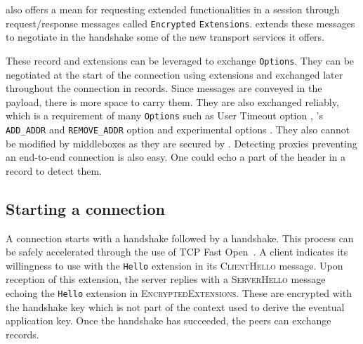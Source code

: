 
\tls also offers a mean for requesting extended functionalities in a \tls session through
request/response messages called \tls \texttt{Encrypted} \texttt{Extensions}. 
\tcpls extends these messages to negotiate in the handshake some of the new
transport services it offers.

These record and extensions can be leveraged to exchange \tcp \texttt{Options}. They can
be negotiated at the start of the connection using \tls extensions and exchanged later
throughout the connection in \tcpls records.
Since \tls messages are conveyed in the \tcp payload, there is more space to carry them.
They are also exchanged reliably, which is a requirement of many \tcp \texttt{Options} such
as \tcp User Timeout option \cite{rfc5482}, \mptcp's \texttt{ADD\_ADDR} and
\texttt{REMOVE\_ADDR} option and experimental \tcp options \cite{rfc6994}.
They also cannot be modified by middleboxes as they are secured by \tls. Detecting \tcp proxies
preventing an end-to-end \tcp connection is also easy. One could echo a part of the \tcp header
in a \tcpls record to detect them.

\subsection{Starting a \tcpls connection}

A \tcpls connection starts with a \tcp handshake followed by a \tls handshake.
This process can be safely accelerated through the use of TCP Fast Open~\cite{rfc7413}.
A \tcpls client
indicates its willingness to use \tcpls with the \tcpls \texttt{Hello} extension
in its \tls \textsc{ClientHello} message. Upon reception of this extension, the \tcpls server
replies with a \tls \textsc{ServerHello} message echoing the \tcpls \texttt{Hello} extension in \tls \textsc{EncryptedExtensions}.
These are encrypted with the handshake key which is not part of the context used to derive the eventual
application key. 
Once the \tls handshake has succeeded, the peers can exchange \tcpls records.

